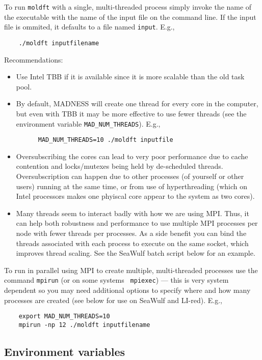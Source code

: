 \documentclass[letterpaper]{book}
\begin{document}
To run {\tt moldft} with a single, multi-threaded process simply
invoke the name of the executable with the name of the input file on
the command line.  If the input file is ommited, it defaults to a file
named {\tt input}.  E.g.,

\begin{verbatim}
    ./moldft inputfilename
\end{verbatim}


Recommendations:
\begin{itemize}
\item Use Intel TBB if it is available since it is more scalable than the old task pool.
\item By default, MADNESS will create one thread for every core in the
  computer, but even with TBB it may be more effective to use fewer threads
  (see the environment variable \verb+MAD_NUM_THREADS+). E.g.,
\begin{verbatim}
      MAD_NUM_THREADS=10 ./moldft inputfile
\end{verbatim}
\item Oversubscribing the cores can lead to very poor performance due to
  cache contention and locks/mutexes being held by de-scheduled
  threads. Oversubscription can happen due to other processes (of yourself or other users)
  running at the same time, or from use of hyperthreading (which on Intel processors
  makes one phyiscal core appear to the system as two cores).
\item Many threads seem to interact badly with how we are using MPI.
  Thus, it can help both robustness and performance to use multiple
  MPI processes per node with fewer threads per processes. As a side benefit you
  can bind the threads associated with each process to execute on the same
  socket, which improves thread scaling.  See the SeaWulf batch script below
  for an example.
\end{itemize}

To run in parallel using MPI to create multiple, multi-threaded
processes use the command {\tt mpirun} (or on some systems {\tt
  mpiexec}) --- this is very system dependent so you may need
additional options to specify where and how many processes are created
(see below for use on SeaWulf and LI-red).  E.g.,

\begin{verbatim}
    export MAD_NUM_THREADS=10
    mpirun -np 12 ./moldft inputfilename
\end{verbatim}

\subsection{Environment variables}
\end{document}
